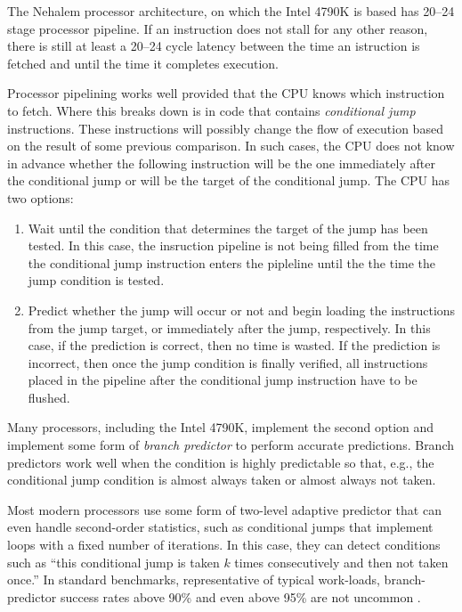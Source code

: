 \documentclass{patmorin}
\begin{document}
The Nehalem processor architecture, on which the Intel 4790K is based has
20--24 stage processor pipeline. If an instruction does not stall for any
other reason, there is still at least a 20--24 cycle latency between the
time an istruction is fetched and until the time it completes execution.

Processor pipelining works well provided that the CPU knows which
instruction to fetch.  Where this breaks down is in code that contains
\emph{conditional jump} instructions. These instructions will possibly
change the flow of execution based on the result of some previous
comparison.  In such cases, the CPU does not know in advance whether the
following instruction will be the one immediately after the conditional
jump or will be the target of the conditional jump. The CPU has two
options:
\begin{enumerate}
  \item Wait until the condition that determines the target
   of the jump has been tested. In this case, the insruction pipeline
   is not being filled from the time the conditional jump instruction
   enters the pipleline until the the time the jump condition is tested.

  \item Predict whether the jump will occur or not and begin loading
  the instructions from the jump target, or immediately after the jump,
  respectively.  In this case, if the prediction is correct, then no
  time is wasted. If the prediction is incorrect, then once the jump
  condition is finally verified, all instructions placed in the pipeline
  after the conditional jump instruction have to be flushed.
\end{enumerate}

Many processors, including the Intel 4790K, implement the second
option and implement some form of \emph{branch predictor} to perform
accurate predictions.  Branch predictors work well when the condition
is highly predictable so that, e.g., the conditional jump condition is
almost always taken or almost always not taken.

Most modern processors use some form of two-level adaptive predictor
\cite{yeh.patt.two-level} that can even handle second-order statistics,
such as conditional jumps that implement loops with a fixed number of
iterations. In this case, they can detect conditions such as ``this
conditional jump is taken $k$ times consecutively and then not taken
once.''  In standard benchmarks, representative of typical work-loads,
branch-predictor success rates above 90\% and even above 95\% are not
uncommon \cite{X}.
\end{document}

